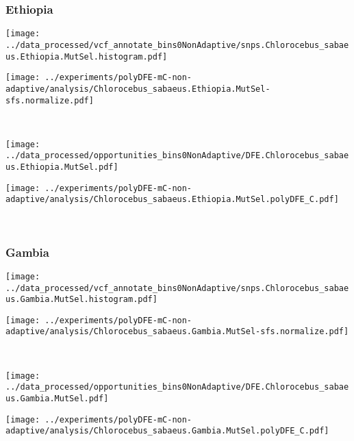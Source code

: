 \subsubsection{Ethiopia}

\begin{minipage}{0.49\linewidth}
    \texttt{[image: ../data\_processed/vcf\_annotate\_bins0NonAdaptive/snps.Chlorocebus\_sabaeus.Ethiopia.MutSel.histogram.pdf]}
\end{minipage}
\begin{minipage}{0.49\linewidth}
    \texttt{[image: ../experiments/polyDFE-mC-non-adaptive/analysis/Chlorocebus\_sabaeus.Ethiopia.MutSel-sfs.normalize.pdf]}
\end{minipage}
\\
\begin{minipage}{0.49\linewidth}
    \texttt{[image: ../data\_processed/opportunities\_bins0NonAdaptive/DFE.Chlorocebus\_sabaeus.Ethiopia.MutSel.pdf]}
\end{minipage}
\begin{minipage}{0.49\linewidth}
    \texttt{[image: ../experiments/polyDFE-mC-non-adaptive/analysis/Chlorocebus\_sabaeus.Ethiopia.MutSel.polyDFE\_C.pdf]}
\end{minipage}
\\

\subsubsection{Gambia}

\begin{minipage}{0.49\linewidth}
    \texttt{[image: ../data\_processed/vcf\_annotate\_bins0NonAdaptive/snps.Chlorocebus\_sabaeus.Gambia.MutSel.histogram.pdf]}
\end{minipage}
\begin{minipage}{0.49\linewidth}
    \texttt{[image: ../experiments/polyDFE-mC-non-adaptive/analysis/Chlorocebus\_sabaeus.Gambia.MutSel-sfs.normalize.pdf]}
\end{minipage}
\\
\begin{minipage}{0.49\linewidth}
    \texttt{[image: ../data\_processed/opportunities\_bins0NonAdaptive/DFE.Chlorocebus\_sabaeus.Gambia.MutSel.pdf]}
\end{minipage}
\begin{minipage}{0.49\linewidth}
    \texttt{[image: ../experiments/polyDFE-mC-non-adaptive/analysis/Chlorocebus\_sabaeus.Gambia.MutSel.polyDFE\_C.pdf]}
\end{minipage}
\\


